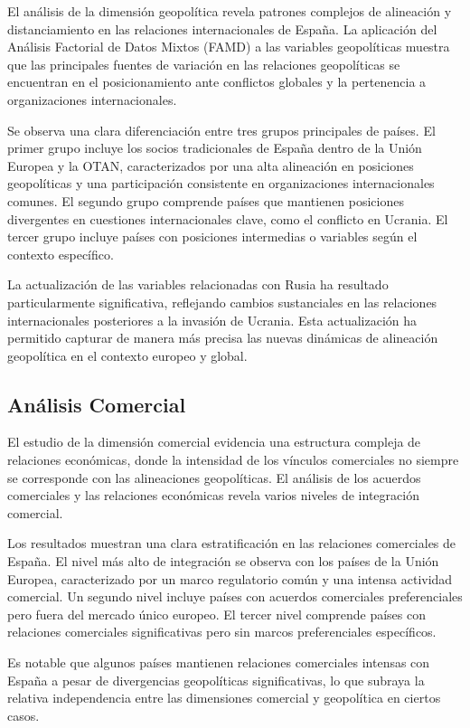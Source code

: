 \documentclass[11pt,a4paper]{article}
\begin{document}
El análisis de la dimensión geopolítica revela patrones complejos de alineación y distanciamiento en las relaciones internacionales de España. La aplicación del Análisis Factorial de Datos Mixtos (FAMD) a las variables geopolíticas muestra que las principales fuentes de variación en las relaciones geopolíticas se encuentran en el posicionamiento ante conflictos globales y la pertenencia a organizaciones internacionales.

Se observa una clara diferenciación entre tres grupos principales de países. El primer grupo incluye los socios tradicionales de España dentro de la Unión Europea y la OTAN, caracterizados por una alta alineación en posiciones geopolíticas y una participación consistente en organizaciones internacionales comunes. El segundo grupo comprende países que mantienen posiciones divergentes en cuestiones internacionales clave, como el conflicto en Ucrania. El tercer grupo incluye países con posiciones intermedias o variables según el contexto específico.

La actualización de las variables relacionadas con Rusia ha resultado particularmente significativa, reflejando cambios sustanciales en las relaciones internacionales posteriores a la invasión de Ucrania. Esta actualización ha permitido capturar de manera más precisa las nuevas dinámicas de alineación geopolítica en el contexto europeo y global.

\subsection{Análisis Comercial}

El estudio de la dimensión comercial evidencia una estructura compleja de relaciones económicas, donde la intensidad de los vínculos comerciales no siempre se corresponde con las alineaciones geopolíticas. El análisis de los acuerdos comerciales y las relaciones económicas revela varios niveles de integración comercial.

Los resultados muestran una clara estratificación en las relaciones comerciales de España. El nivel más alto de integración se observa con los países de la Unión Europea, caracterizado por un marco regulatorio común y una intensa actividad comercial. Un segundo nivel incluye países con acuerdos comerciales preferenciales pero fuera del mercado único europeo. El tercer nivel comprende países con relaciones comerciales significativas pero sin marcos preferenciales específicos.

Es notable que algunos países mantienen relaciones comerciales intensas con España a pesar de divergencias geopolíticas significativas, lo que subraya la relativa independencia entre las dimensiones comercial y geopolítica en ciertos casos.
\end{document}

